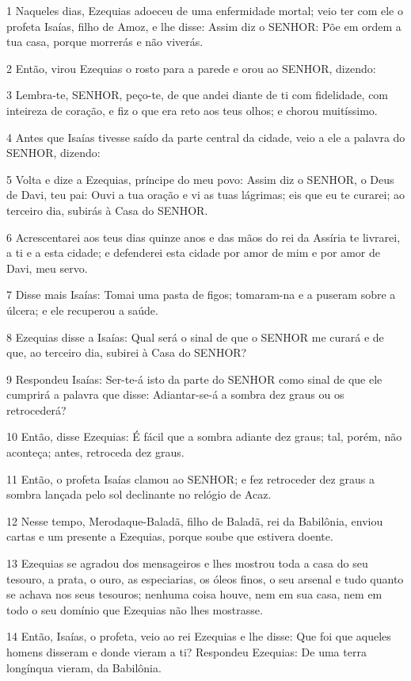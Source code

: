 \par 1 Naqueles dias, Ezequias adoeceu de uma enfermidade mortal; veio ter com ele o profeta Isaías, filho de Amoz, e lhe disse: Assim diz o SENHOR: Põe em ordem a tua casa, porque morrerás e não viverás.
\par 2 Então, virou Ezequias o rosto para a parede e orou ao SENHOR, dizendo:
\par 3 Lembra-te, SENHOR, peço-te, de que andei diante de ti com fidelidade, com inteireza de coração, e fiz o que era reto aos teus olhos; e chorou muitíssimo.
\par 4 Antes que Isaías tivesse saído da parte central da cidade, veio a ele a palavra do SENHOR, dizendo:
\par 5 Volta e dize a Ezequias, príncipe do meu povo: Assim diz o SENHOR, o Deus de Davi, teu pai: Ouvi a tua oração e vi as tuas lágrimas; eis que eu te curarei; ao terceiro dia, subirás à Casa do SENHOR.
\par 6 Acrescentarei aos teus dias quinze anos e das mãos do rei da Assíria te livrarei, a ti e a esta cidade; e defenderei esta cidade por amor de mim e por amor de Davi, meu servo.
\par 7 Disse mais Isaías: Tomai uma pasta de figos; tomaram-na e a puseram sobre a úlcera; e ele recuperou a saúde.
\par 8 Ezequias disse a Isaías: Qual será o sinal de que o SENHOR me curará e de que, ao terceiro dia, subirei à Casa do SENHOR?
\par 9 Respondeu Isaías: Ser-te-á isto da parte do SENHOR como sinal de que ele cumprirá a palavra que disse: Adiantar-se-á a sombra dez graus ou os retrocederá?
\par 10 Então, disse Ezequias: É fácil que a sombra adiante dez graus; tal, porém, não aconteça; antes, retroceda dez graus.
\par 11 Então, o profeta Isaías clamou ao SENHOR; e fez retroceder dez graus a sombra lançada pelo sol declinante no relógio de Acaz.
\par 12 Nesse tempo, Merodaque-Baladã, filho de Baladã, rei da Babilônia, enviou cartas e um presente a Ezequias, porque soube que estivera doente.
\par 13 Ezequias se agradou dos mensageiros e lhes mostrou toda a casa do seu tesouro, a prata, o ouro, as especiarias, os óleos finos, o seu arsenal e tudo quanto se achava nos seus tesouros; nenhuma coisa houve, nem em sua casa, nem em todo o seu domínio que Ezequias não lhes mostrasse.
\par 14 Então, Isaías, o profeta, veio ao rei Ezequias e lhe disse: Que foi que aqueles homens disseram e donde vieram a ti? Respondeu Ezequias: De uma terra longínqua vieram, da Babilônia.
